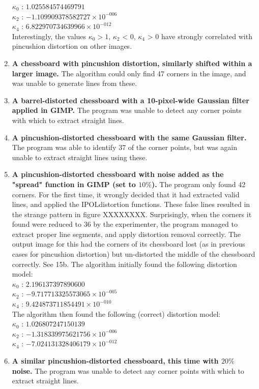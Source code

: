 \begin{enumerate}
   $ \kappa_{0}$ : $1.025584574469791$\\
   $ \kappa_{2}$ : $-1.109909378582727 \times 10^{-006}$\\
   $ \kappa_{4}$ : $6.822970734639966 \times 10^{-012}$\\
   Interestingly, the values $\kappa_{0} > 1$, $\kappa_{2}$ < 0, $\kappa_{4}$ > 0 have strongly correlated with pincushion distortion on other images.
  \item \textbf{A chessboard with pincushion distortion, similarly shifted within a larger image.} The algorithm could only find 47 corners in the image, and was unable to generate lines from these.
  \item \textbf{A barrel-distorted chessboard with a 10-pixel-wide Gaussian filter applied in GIMP.} The program was unable to detect any corner points with which to extract straight lines.
  \item \textbf{A pincushion-distorted chessboard with the same Gaussian filter.} The program was able to identify 37 of the corner points, but was again unable to extract straight lines using these.
  \item \textbf{A pincushion-distorted chessboard with noise added as the "spread" function in GIMP (set to $10\%$).} The program only found 42 corners. For the first time, it wrongly decided that it had extracted valid lines, and applied the IPOLdistortion functions. These false lines resulted in the strange pattern in figure XXXXXXXX. Surprisingly, when the corners it found were reduced to 36 by the experimenter, the program managed to extract proper line segments, and apply distortion removal correctly. The output image for this had the corners of its chessboard lost (as in previous cases for pincushion distortion) but un-distorted the middle of the chessboard correctly. See 15b. The algorithm initially found the following distortion model:\\
   $ \kappa_{0}$ : $2.196137397890600$\\
   $ \kappa_{2}$ : $-9.717713325573065 \times 10^{-005}$\\
   $ \kappa_{4}$ : $9.424873711854491 \times 10^{-010}$\\
The algorithm then found the following (correct) distortion model:\\
   $ \kappa_{0}$ : $1.026807247150139$\\
   $ \kappa_{2}$ : $-1.318339975621756 \times 10^{-006}$\\
   $ \kappa_{4}$ : $-7.024131328406179 \times 10^{-012}$
  \item \textbf{A similar pincushion-distorted chessboard, this time with $20\%$ noise.} The program was unable to detect any corner points with which to extract straight lines.

\end{enumerate}
